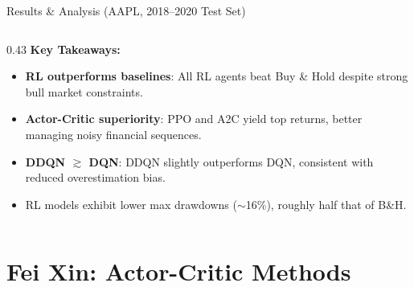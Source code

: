 \documentclass[aspectratio=169, 10pt]{beamer}
\begin{document}
\begin{frame}{Results \& Analysis (AAPL, 2018--2020 Test Set)}
\begin{columns}[T]
\begin{column}{0.43\textwidth}
\vspace{0.2em}
{\scriptsize \textbf{Key Takeaways:}}

\vspace{0.1em}
{\tiny
\begin{itemize}\setlength\itemsep{2pt}
  \item[\textcolor{good}{\checkmark}] \textbf{RL outperforms baselines}: All RL agents beat Buy \& Hold despite strong bull market constraints.
  \item[\textcolor{good}{\checkmark}] \textbf{Actor-Critic superiority}: PPO and A2C yield top returns, better managing noisy financial sequences.
  \item[\textcolor{good}{\checkmark}] \textbf{DDQN $\gtrsim$ DQN}: DDQN slightly outperforms DQN, consistent with reduced overestimation bias.
  \item[\textcolor{neutral}{!}] RL models exhibit lower max drawdowns ($\sim$16\%), roughly half that of B\&H.
\end{itemize}
}
\end{column}
\end{columns}
\end{frame}

\section{Fei Xin: Actor-Critic Methods}
\end{document}

